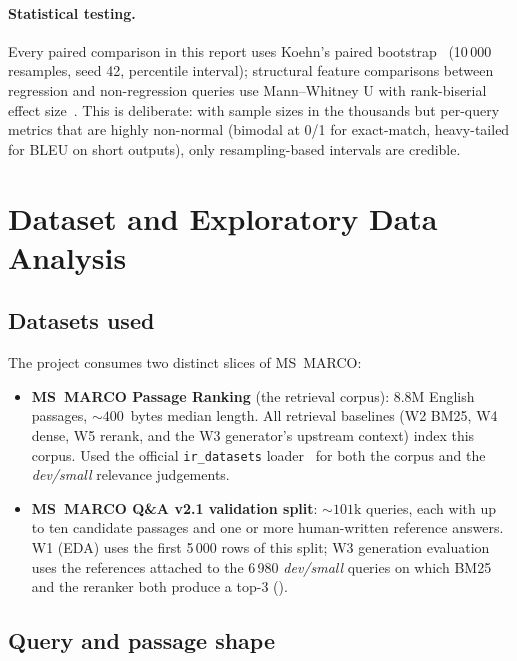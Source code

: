 \documentclass[11pt,a4paper]{article}
\newcommand{\devsmall}{\textit{dev/small}}
\newcommand{\fdev}{6\,980}
\newcommand{\msmarco}{MS~MARCO}
\newcommand{\bmtwofive}{BM25}
\begin{document}
\paragraph{Statistical testing.}  Every paired comparison in this
report uses Koehn's paired bootstrap~\cite{koehn2004bootstrap}
(10\,000 resamples, seed 42, percentile interval); structural
feature comparisons between regression and non-regression queries
use Mann--Whitney U with rank-biserial effect
size~\cite{mannwhitney1947}.  This is deliberate: with sample sizes
in the thousands but per-query metrics that are highly non-normal
(bimodal at 0/1 for exact-match, heavy-tailed for BLEU on short
outputs), only resampling-based intervals are credible.

\clearpage\section{Dataset and Exploratory Data Analysis}
\label{sec:dataset}

\subsection{Datasets used}

The project consumes two distinct slices of \msmarco{}:

\begin{itemize}
  \item \textbf{\msmarco{} Passage Ranking} (the retrieval corpus): 8.8M
        English passages, $\sim\!400$~bytes median length.  All
        retrieval baselines (W2 \bmtwofive{}, W4 dense, W5 rerank, and
        the W3 generator's upstream context) index this corpus.  Used
        the official \texttt{ir\_datasets}
        loader~\cite{macavaney2021irdatasets} for both the corpus and
        the \devsmall{} relevance judgements.
  \item \textbf{\msmarco{} Q\&A v2.1 validation split}: $\sim\!101$k
        queries, each with up to ten candidate passages and one or
        more human-written reference answers.  W1 (EDA) uses the
        first 5\,000 rows of this split; W3 generation evaluation
        uses the references attached to the \fdev{} \devsmall{}
        queries on which \bmtwofive{} and the reranker both produce a
        top-3 ().
\end{itemize}

\subsection{Query and passage shape}
\end{document}
